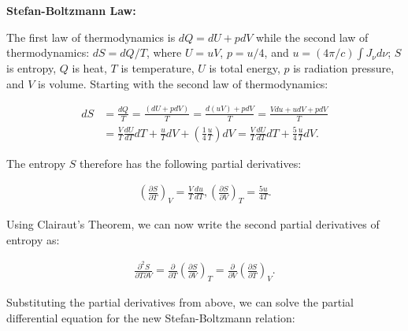 \documentclass[12pt]{article}
\begin{document}
{\noindent}\textbf{Stefan-Boltzmann Law:}

The first law of thermodynamics is $dQ = dU + pdV$ while the second law of thermodynamics: $dS = dQ/T$, where $U=uV$, $p=u/4$, and $u = (4\pi/c)\int J_\nu d\nu$; $S$ is entropy, $Q$ is heat, $T$ is temperature, $U$ is total energy, $p$ is radiation pressure, and $V$ is volume. Starting with the second law of thermodynamics:

\begin{equation*}
\begin{split}
dS &= \frac{dQ}{T} = \frac{(dU+pdV)}{T} = \frac{d(uV)+pdV}{T} = \frac{Vdu+udV+pdV}{T} \\
&= \frac{V}{T}\frac{dU}{dT}dT + \frac{u}{T}dV + \left(\frac{1}{4}\frac{u}{T}\right)dV = \frac{V}{T}\frac{dU}{dT}dT + \frac{5}{4}\frac{u}{T}dV.
\end{split}
\end{equation*}

The entropy $S$ therefore has the following partial derivatives:

\begin{align*}
\left(\frac{\partial S}{\partial T}\right)_V = \frac{V}{T}\frac{du}{dT}, \left(\frac{\partial S}{\partial V}\right)_T = \frac{5u}{4T}.
\end{align*}

Using Clairaut's Theorem, we can now write the second partial derivatives of entropy as:

\begin{align*}
\frac{\partial^2S}{\partial T \partial V} = \frac{\partial}{\partial T}\left(\frac{\partial S}{\partial V}\right)_T = \frac{\partial}{\partial V}\left(\frac{\partial S}{\partial T}\right)_V.
\end{align*}

Substituting the partial derivatives from above, we can solve the partial differential equation for the new Stefan-Boltzmann relation:
\end{document}
